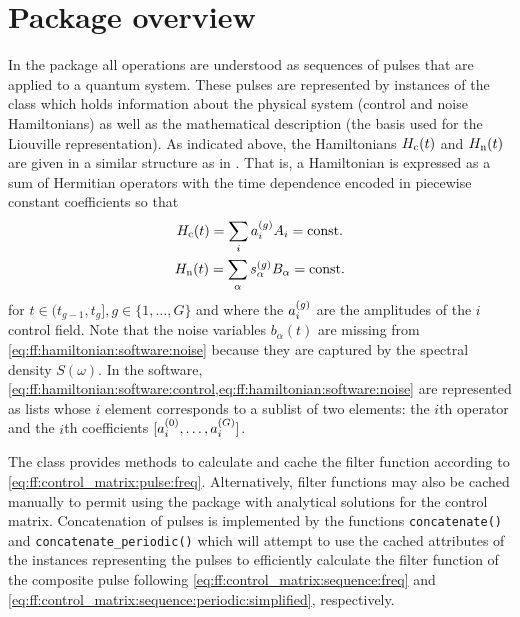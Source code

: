 \section{Package overview}\label{sec:ff:software:overview}
In the \filterfunctions package all operations are understood as sequences of pulses that are applied to a quantum system.
These pulses are represented by instances of the \pulsesequence class which holds information about the physical system (control and noise Hamiltonians) as well as the mathematical description (\eg the basis used for the Liouville representation).
As indicated above, the Hamiltonians $H_{\mathrm{c}}(t)$ and $H_{\mathrm{n}}(t)$ are given in a similar structure as in \qutip.
That is, a Hamiltonian is expressed as a sum of Hermitian operators with the time dependence encoded in piecewise constant coefficients so that
\begin{subequations}\label{eq:ff:hamiltonian:software}
\begin{gather}
    H_{\mathrm{c}}(t) = \sum_i a^{(g)}_i A_i = \mathrm{const.} \label{eq:ff:hamiltonian:software:control} \\
    H_{\mathrm{n}}(t) = \sum_\alpha s^{(g)}_\alpha B_\alpha = \mathrm{const.} \label{eq:ff:hamiltonian:software:noise}
\end{gather}
\end{subequations}
for $t\in (t_{g-1}, t_g], g\in\lbrace 1,\dotsc,G\rbrace$ and where the $a^{(g)}_i$ are the amplitudes of the $i$ control field.
Note that the noise variables $b_\alpha(t)$ are missing from \cref{eq:ff:hamiltonian:software:noise} because they are captured by the spectral density $S(\omega)$.
In the software, \cref{eq:ff:hamiltonian:software:control,eq:ff:hamiltonian:software:noise} are represented as lists whose $i$ element corresponds to a sublist of two elements: the $i$th operator and the $i$th coefficients $[a_i^{(0)},\dotsc,a_i^{(G)}]$.

The \pulsesequence class provides methods to calculate and cache the filter function according to \cref{eq:ff:control_matrix:pulse:freq}.
Alternatively, filter functions may also be cached manually to permit using the package with analytical solutions for the control matrix.
Concatenation of pulses is implemented by the functions \verb|concatenate()| and \verb|concatenate_periodic()| which will attempt to use the cached attributes of the \pulsesequence instances representing the pulses to efficiently calculate the filter function of the composite pulse following \cref{eq:ff:control_matrix:sequence:freq} and \cref{eq:ff:control_matrix:sequence:periodic:simplified}, respectively.

